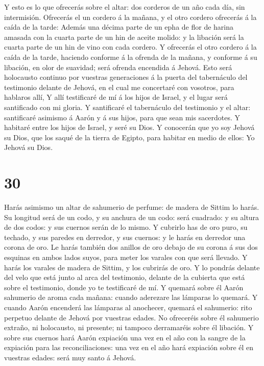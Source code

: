  Y esto es lo que ofrecerás sobre el altar: dos corderos de
un año cada día, sin intermisión.  Ofrecerás el un cordero
á la mañana, y el otro cordero ofrecerás á la caída de la tarde:
 Además una décima parte de un epha de flor de harina
amasada con la cuarta parte de un hin de aceite molido: y la libación
será la cuarta parte de un hin de vino con cada cordero.  Y
ofrecerás el otro cordero á la caída de la tarde, haciendo conforme á la
ofrenda de la mañana, y conforme á su libación, en olor de suavidad;
será ofrenda encendida á Jehová.  Esto será holocausto
continuo por vuestras generaciones á la puerta del tabernáculo del
testimonio delante de Jehová, en el cual me concertaré con vosotros,
para hablaros allí,  Y allí testificaré de mí á los hijos
de Israel, y el lugar será santificado con mi gloria.  Y
santificaré el tabernáculo del testimonio y el altar: santificaré
asimismo á Aarón y á sus hijos, para que sean mis sacerdotes.
 Y habitaré entre los hijos de Israel, y seré su Dios.
 Y conocerán que yo soy Jehová su Dios, que los saqué de la
tierra de Egipto, para habitar en medio de ellos: Yo Jehová su Dios.

\hypertarget{section-29}{%
\section{30}\label{section-29}}

 Harás asimismo un altar de sahumerio de perfume: de madera
de Sittim lo harás.  Su longitud será de un codo, y su
anchura de un codo: será cuadrado: y su altura de dos codos: y sus
cuernos serán de lo mismo.  Y cubrirlo has de oro puro, su
techado, y sus paredes en derredor, y sus cuernos: y le harás en
derredor una corona de oro.  Le harás también dos anillos de
oro debajo de su corona á sus dos esquinas en ambos lados suyos, para
meter los varales con que será llevado.  Y harás los varales
de madera de Sittim, y los cubrirás de oro.  Y lo pondrás
delante del velo que está junto al arca del testimonio, delante de la
cubierta que está sobre el testimonio, donde yo te testificaré de mí.
 Y quemará sobre él Aarón sahumerio de aroma cada mañana:
cuando aderezare las lámparas lo quemará.  Y cuando Aarón
encenderá las lámparas al anochecer, quemará el sahumerio: rito perpetuo
delante de Jehová por vuestras edades.  No ofreceréis sobre
él sahumerio extraño, ni holocausto, ni presente; ni tampoco derramaréis
sobre él libación.  Y sobre sus cuernos hará Aarón
expiación una vez en el año con la sangre de la expiación para las
reconciliaciones: una vez en el año hará expiación sobre él en vuestras
edades: será muy santo á Jehová.

